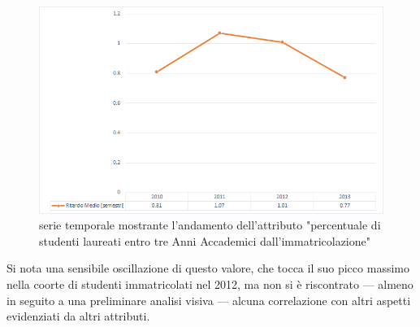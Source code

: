         \begin{figure}
        \centering
        \caption{serie temporale mostrante l'andamento dell'attributo "percentuale di studenti laureati entro tre Anni Accademici dall'immatricolazione"}
        \label{laureati}
        \includegraphics[scale=0.55]{../visual/stud_3.png}
    \end{figure}

    Si nota una sensibile oscillazione di questo valore, che tocca il suo picco massimo nella coorte di studenti immatricolati nel 2012, ma non si è riscontrato --- almeno in seguito a una preliminare analisi visiva --- alcuna correlazione con altri aspetti evidenziati da altri attributi.
